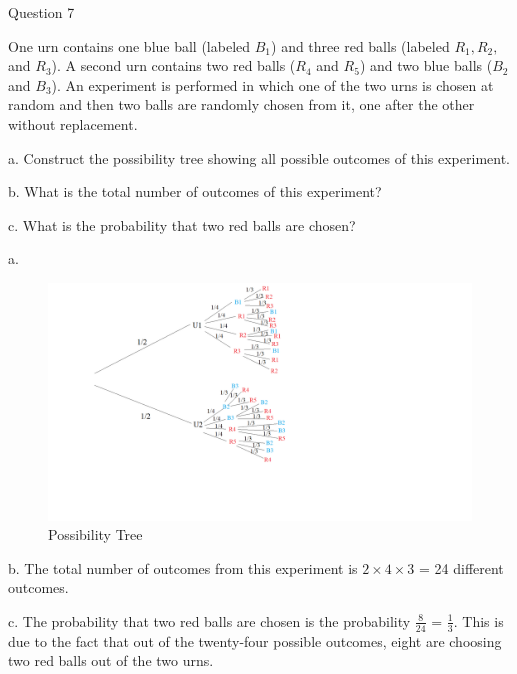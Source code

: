 \documentclass{article}
\begin{document}
\clearpage
{} Question 7
\item[]One urn contains one blue ball (labeled $B_1$) and three red balls (labeled $R_1, R_2,$ and $R_3$). A second urn contains two red balls ($R_4$ and $R_5$) and two blue balls ($B_2$ and $B_3$). An experiment is performed in which one of the two urns is chosen at random and then two balls are randomly chosen from it, one after the other without replacement.
\item[]a. Construct the possibility tree showing all possible outcomes of this experiment.
\item[]b. What is the total number of outcomes of this experiment?
\item[]c. What is the probability that two red balls are chosen?
\item[]a. \begin{figure}[h!]
  \includegraphics[width=\linewidth]{Untitled.png}
  \caption{Possibility Tree}
  \label{fig:map1}
\end{figure}
\clearpage
\header
\item[]b. The total number of outcomes from this experiment is $2 \times 4 \times 3$ = 24 different outcomes.
\item[]c. The probability that two red balls are chosen is the probability $\frac{8}{24}$ = $\frac{1}{3}$. This is due to the fact that out of the twenty-four possible outcomes, eight are choosing two red balls out of the two urns.
\end{document}
